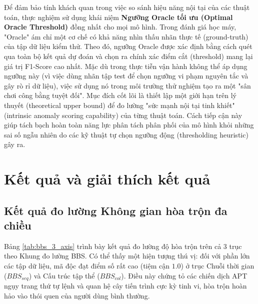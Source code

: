 \documentclass[../main.tex]{subfiles}
\begin{document}
Để đảm bảo tính khách quan trong việc so sánh hiệu năng nội tại của các thuật toán, thực nghiệm sử dụng khái niệm \textbf{Ngưỡng Oracle tối ưu (Optimal Oracle Threshold)} đồng nhất cho mọi mô hình. Trong đánh giá học máy, "Oracle" ám chỉ một cơ chế có khả năng nhìn thấu nhãn thực tế (ground-truth) của tập dữ liệu kiểm thử. Theo đó, ngưỡng Oracle được xác định bằng cách quét qua toàn bộ kết quả dự đoán và chọn ra chính xác điểm cắt (threshold) mang lại giá trị F1-Score cao nhất. Mặc dù trong thực tiễn vận hành không thể áp dụng ngưỡng này (vì việc dùng nhãn tập test để chọn ngưỡng vi phạm nguyên tắc và gây rò rỉ dữ liệu), việc sử dụng nó trong môi trường thử nghiệm tạo ra một "sân chơi công bằng tuyệt đối". Mục đích cốt lõi là thiết lập một giới hạn trên lý thuyết (theoretical upper bound) để đo lường "sức mạnh nội tại tinh khiết" (intrinsic anomaly scoring capability) của từng thuật toán. Cách tiếp cận này giúp tách bạch hoàn toàn năng lực phân tách phân phối của mô hình khỏi những sai số ngẫu nhiên do các kỹ thuật tự chọn ngưỡng động (thresholding heuristic) gây ra.

\section{Kết quả và giải thích kết quả}
\label{section:3.3}

\subsection{Kết quả đo lường Không gian hòa trộn đa chiều}
\label{subsection:3.3.1}
Bảng \ref{tab:bbs_3_axis} trình bày kết quả đo lường độ hòa trộn trên cả 3 trục theo Khung đo lường BBS. Có thể thấy một hiện tượng thú vị: đối với phần lớn các tập dữ liệu, mã độc đạt điểm số rất cao (tiệm cận $1.0$) ở trục Chuỗi thời gian ($BBS_{seq}$) và Cấu trúc tập thể ($BBS_{col}$). Điều này chứng tỏ các chiến dịch APT ngụy trang thứ tự lệnh và quan hệ cây tiến trình cực kỳ tinh vi, hòa trộn hoàn hảo vào thói quen của người dùng bình thường.
\end{document}
